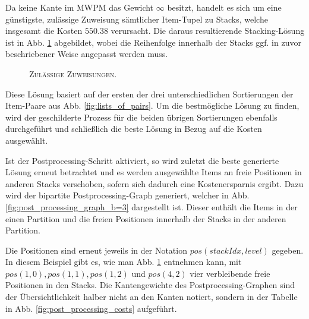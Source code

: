 Da keine Kante im \textsc{MWPM} das Gewicht $\infty$ besitzt, handelt es sich um eine günstigste, zulässige Zuweisung
sämtlicher Item-Tupel zu Stacks, welche insgesamt die Kosten $550.38$ verursacht.
Die daraus resultierende Stacking-Lösung ist in Abb. \ref{fig:valid_solution} abgebildet, wobei die Reihenfolge
innerhalb der Stacks ggf. in zuvor beschriebener Weise angepasst werden muss.
\begin{figure}[H]
  \centering
    \caption{\textsc{Zulässige Zuweisungen.}}
    \label{fig:valid_solution}
\end{figure}

Diese Lösung basiert auf der ersten der drei unterschiedlichen Sortierungen der Item-Paare aus Abb. \ref{fig:lists_of_pairs}.
Um die bestmögliche Lösung zu finden, wird der geschilderte Prozess für die beiden übrigen Sortierungen
ebenfalls durchgeführt und schließlich die beste Lösung in Bezug auf die Kosten ausgewählt.

Ist der Postprocessing-Schritt aktiviert, so wird zuletzt die beste generierte Lösung erneut betrachtet
und es werden ausgewählte Items an freie Positionen in anderen Stacks verschoben, sofern sich dadurch eine
Kostenersparnis ergibt.
Dazu wird der bipartite Postprocessing-Graph generiert, welcher in Abb. \ref{fig:post_processing_graph_b=3} dargestellt ist.
Dieser enthält die Items in der einen Partition und die freien Positionen innerhalb der Stacks in der anderen Partition.

Die Positionen sind erneut jeweils in der Notation $pos(stackIdx, level)$ gegeben. In diesem Beispiel gibt es,
wie man Abb. \ref{fig:valid_solution} entnehmen kann, mit $pos(1, 0), pos(1, 1), pos(1, 2)$ und $pos(4, 2)$
vier verbleibende freie Positionen in den Stacks. Die Kantengewichte des Postprocessing-Graphen sind der Übersichtlichkeit halber nicht an den Kanten notiert, sondern in der Tabelle in Abb. \ref{fig:post_processing_costs} aufgeführt.

